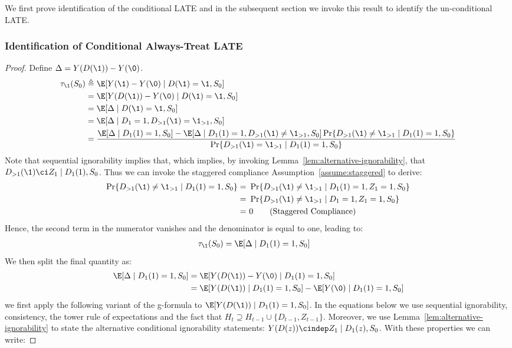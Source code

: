 We first prove identification of the conditional LATE and in the subsequent section we invoke this result to identify the un-conditional LATE.

\subsubsection{Identification of Conditional Always-Treat LATE}
\begin{proof}
Define $\Delta = Y(D(\1)) - Y(\0)$.
\begin{align}
\tau_{\1}(S_0)
&\triangleq \E[ Y(\1) - Y(\0) \mid D(\1)=\1, S_0 ]        \nonumber \\
&= \E[ Y(D(\1)) - Y(\0) \mid D(\1)=\1, S_0 ]  \nonumber \\
&= \E[\Delta \mid D(\1)=\1, S_0 ]  \nonumber \\
&= \E[ \Delta \mid D_1=1, D_{>1}(\1)=\1_{>1}, S_0 ] \nonumber\\
&= \frac{
    \E[ \Delta \mid D_1(1)=1, S_0 ]
    - \E[\Delta \mid D_1(1)=1, D_{>1}(\1)\neq \1_{>1}, S_0]
       \Pr\{ D_{>1}(\1)\neq \1_{>1} \mid D_1(1)=1, S_0 \}
  }{ \Pr\{ D_{>1}(\1)= \1_{>1}  \mid D_1(1)=1, S_0 \} } \nonumber
\end{align}
Note that sequential ignorability implies that, which implies, by invoking Lemma~\ref{lem:alternative-ignorability}, that $D_{>1}(\1) \ci Z_1 \mid D_1(1), S_0$. Thus we can invoke the staggered compliance Assumption~\ref{assume:staggered} to derive:
\begin{align}
    \Pr\{ D_{>1}(\1)\neq \1_{>1} \mid D_1(1)=1, S_0 \} =~& \Pr\{ D_{>1}(\1)\neq \1_{>1} \mid D_1(1)=1, Z_1=1, S_0 \} \nonumber\\
    =~& \Pr\{ D_{>1}(\1)\neq \1_{>1} \mid D_1=1, Z_1=1, S_0 \} \nonumber\\
    =~& 0 \tag{Staggered Compliance}
\end{align}
Hence, the second term in the numerator vanishes and the denominator is equal to one, leading to:
\begin{align}
\tau_{\1}(S_0) &= \E[ \Delta \mid  D_1(1)=1, S_0] 
\end{align}
We then split the final quantity as:
\begin{align*}
\E[ \Delta \mid D_1(1)=1, S_0 ]
&=\E[ Y(D(\1)) - Y(\0) \mid D_1(1)=1, S_0 ]                           \\
&=\E[ Y(D(\1)) \mid D_1(1)=1, S_0 ] - \E[ Y(\0) \mid D_1(1)=1, S_0 ]  
\end{align*}
we first apply the following variant of the g-formula to $\E[Y(D(\1)) \mid D_1(1)=1, S_0]$. In the equations below we use sequential ignorability, consistency, the tower rule of expectations and the fact that $H_t \supseteq H_{t-1} \cup \{D_{t-1}, Z_{t-1}\}$. Moreover, we use Lemma~\ref{lem:alternative-ignorability} to state the alternative conditional ignorability statements: $Y(D(z)) \cindep Z_1 \mid D_1(z), S_0$. With these properties we can write:

\end{proof}
